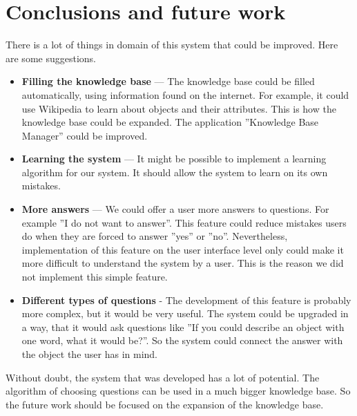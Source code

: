 \documentclass[a4paper]{article}
\begin{document}
\section{Conclusions and future work}
There is a lot of things in domain of this system that could be improved. Here are some suggestions.
\begin{itemize}
\item\textbf{Filling the knowledge base} --- The knowledge base could be filled automatically, using information found on the internet. For example, it could use Wikipedia to learn about objects and their attributes. This is how the knowledge base could be expanded. The application ''Knowledge Base Manager'' could be improved. 
\item\textbf{Learning the system} --- It might be possible to implement a learning algorithm for our system. It should allow the system to learn on its own mistakes.
\item\textbf{More answers} --- We could offer a user more answers to questions. For example ''I do not want to answer''. This feature could reduce mistakes users do when they are forced to answer ''yes'' or ''no''. Nevertheless, implementation of this feature on the user interface level only could make it more difficult to understand the system by a user. This is the reason we did not implement this simple feature.
\item\textbf{Different types of questions} - The development of this feature is probably more complex, but it would be very useful. The system could be upgraded in a way, that it would ask questions like ''If you could describe an object with one word, what it would be?''. So the system could connect the answer with the object the user has in mind.
\end{itemize}
Without doubt, the system that was developed has a lot of potential. The algorithm of choosing questions can be used in a much bigger knowledge base. So the future work should be focused on the expansion of the knowledge base. 
\end{document}
